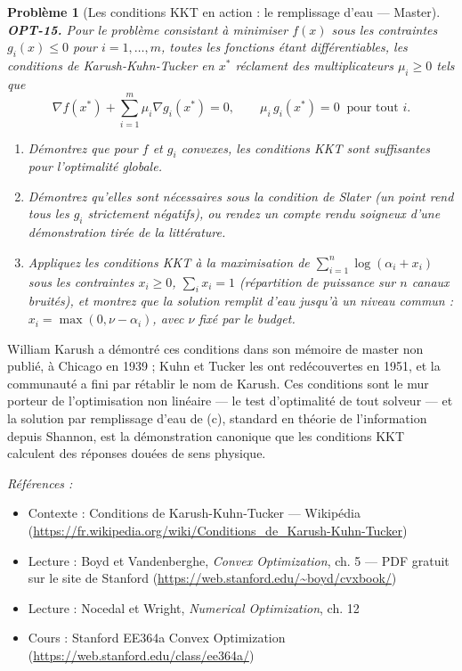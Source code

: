 \documentclass[11pt]{article}
\newtheorem{problem}{Problème}
\newenvironment{refs}{\par\small\noindent\emph{Références :}\begin{itemize}\setlength\itemsep{0pt}}{\end{itemize}\normalsize}
\begin{document}
\begin{problem}[{Les conditions KKT en action : le remplissage d'eau --- Master}]
\textbf{OPT-15.} Pour le problème consistant à minimiser $f(x)$ sous les contraintes $g_i(x) \le 0$ pour $i = 1, \dots, m$, toutes les fonctions étant différentiables, les conditions de Karush-Kuhn-Tucker en $x^*$ réclament des multiplicateurs $\mu_i \ge 0$ tels que
\[ \nabla f(x^*) + \sum_{i=1}^m \mu_i \nabla g_i(x^*) = 0, \qquad \mu_i\, g_i(x^*) = 0 \ \text{ pour tout } i. \]
\begin{enumerate}
\item[(a)] Démontrez que pour $f$ et $g_i$ convexes, les conditions KKT sont suffisantes pour l'optimalité globale.
\item[(b)] Démontrez qu'elles sont nécessaires sous la condition de Slater (un point rend tous les $g_i$ strictement négatifs), ou rendez un compte rendu soigneux d'une démonstration tirée de la littérature.
\item[(c)] Appliquez les conditions KKT à la maximisation de $\sum_{i=1}^n \log(\alpha_i + x_i)$ sous les contraintes $x_i \ge 0$, $\sum_i x_i = 1$ (répartition de puissance sur $n$ canaux bruités), et montrez que la solution \og{} remplit d'eau jusqu'à un niveau commun \fg{} : $x_i = \max(0, \nu - \alpha_i)$, avec $\nu$ fixé par le budget.
\end{enumerate}

\end{problem}

\noindent William Karush a démontré ces conditions dans son mémoire de master non publié, à Chicago en 1939 ; Kuhn et Tucker les ont redécouvertes en 1951, et la communauté a fini par rétablir le nom de Karush. Ces conditions sont le mur porteur de l'optimisation non linéaire --- le test d'optimalité de tout solveur --- et la solution par remplissage d'eau de (c), standard en théorie de l'information depuis Shannon, est la démonstration canonique que les conditions KKT calculent des réponses douées de sens physique.

\begin{refs}
\item Contexte : Conditions de Karush-Kuhn-Tucker --- Wikipédia (\url{https://fr.wikipedia.org/wiki/Conditions_de_Karush-Kuhn-Tucker})
\item Lecture : Boyd et Vandenberghe, \textit{Convex Optimization}, ch. 5 --- PDF gratuit sur le site de Stanford (\url{https://web.stanford.edu/~boyd/cvxbook/})
\item Lecture : Nocedal et Wright, \textit{Numerical Optimization}, ch. 12
\item Cours : Stanford EE364a Convex Optimization (\url{https://web.stanford.edu/class/ee364a/})
\end{refs}
\end{document}
